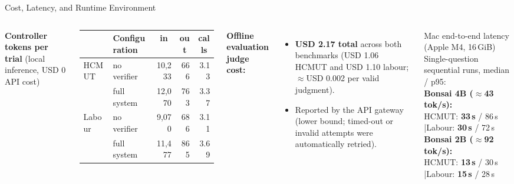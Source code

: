 \documentclass[aspectratio=1610,11pt]{beamer}
\newcommand{\cell}[1]{\multicolumn{1}{c}{#1}}
\begin{document}
\begin{frame}{Cost, Latency, and Runtime Environment}
  \begin{columns}[T]
    \footnotesize
    \textbf{Controller tokens per trial} (local inference, USD 0 API cost)
    \vspace{3pt}

    \begin{tabular}{@{}llrrr@{}}
      \toprule & Configuration & \cell{in} & \cell{out} & \cell{calls}\\\midrule
      HCMUT & no verifier & 10,233 & 666 & 3.13\\
      & full system & 12,070 & 763 & 3.37\\
      Labour & no verifier & 9,070 & 686 & 3.11\\
      & full system & 11,477 & 865 & 3.69\\
      \bottomrule
    \end{tabular}
    \vspace{6pt}

    \textbf{Offline evaluation judge cost:}
    \begin{itemize}\footnotesize
      \item \textbf{USD 2.17 total} across both benchmarks (USD 1.06 HCMUT and USD 1.10 labour; $\approx$USD 0.002 per valid judgment).
      \item Reported by the API gateway (lower bound; timed-out or invalid attempts were automatically retried).
    \end{itemize}

    \begin{alertblock}{Mac end-to-end latency (Apple M4, 16\,GiB)}
      \footnotesize Single-question sequential runs, median / p95:\\[3pt]
      \textbf{Bonsai 4B ($\approx$43 tok/s):}\\
      \quad HCMUT: \textbf{33\,s} / 86\,s \quad|\quad Labour: \textbf{30\,s} / 72\,s\\[3pt]
      \textbf{Bonsai 2B ($\approx$92 tok/s):}\\
      \quad HCMUT: \textbf{13\,s} / 30\,s \quad|\quad Labour: \textbf{15\,s} / 28\,s
    \end{alertblock}
    \vspace{1pt}


\end{columns}
\end{frame}
\end{document}

